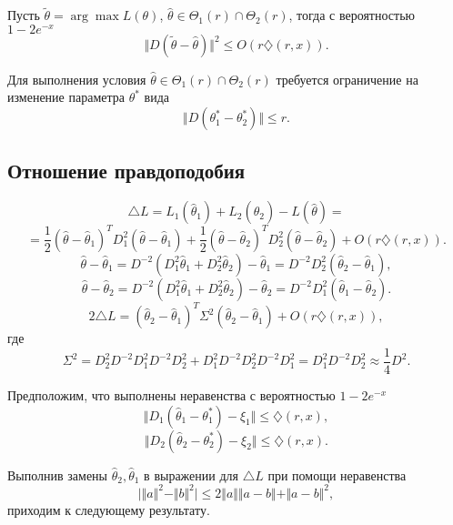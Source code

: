 \begin{lemma}
Пусть $\tilde{\theta} = \arg\max L(\theta)$, $\widehat{\theta} \in \Theta_1(r) \cap \Theta_2(r)$, тогда с вероятностью $1 - 2 e^{-x}$
\[
\Vert D (\tilde{\theta} -  \widehat{\theta}) \Vert^2 \leq O (r \diamondsuit (r, x)).
\]
\end{lemma}

\begin{remark}
Для выполнения условия $\widehat{\theta} \in \Theta_1(r) \cap \Theta_2(r)$ требуется ограничение на изменение параметра $\theta^*$ вида
\[\tag{L*}
\Vert D(\theta_1^* - \theta_2^*) \Vert \leq r.
\]  
\end{remark}

\subsection{Отношение правдоподобия} 

\[
\triangle L =
L_1(\widehat{\theta}_1) + L_2(\widehat{\theta}_2) -  L(\widehat{\theta}) = 
\]
\[
=   \frac{1}{2} (\widehat{\theta} - \widehat{\theta}_1)^T D_1^2  (\widehat{\theta} - \widehat{\theta}_1)
+ \frac{1}{2} (\widehat{\theta} - \widehat{\theta}_2)^T D_2^2  (\widehat{\theta} - \widehat{\theta}_2) + O(r \diamondsuit (r, x)).
\]
\[
\widehat{\theta} - \widehat{\theta}_1 = D^{-2} (D_1^2 \widehat{\theta}_1 + D_2^2 \widehat{\theta}_2 ) - \widehat{\theta}_1 = D^{-2} D_2^2 ( \widehat{\theta}_2 -  \widehat{\theta}_1),
\]
\[
\widehat{\theta} - \widehat{\theta}_2 = D^{-2} (D_1^2 \widehat{\theta}_1 + D_2^2 \widehat{\theta}_2 ) - \widehat{\theta}_2 = D^{-2} D_1^2 ( \widehat{\theta}_1 -  \widehat{\theta}_2).
\]
\[
2 \triangle L =  ( \widehat{\theta}_2 -  \widehat{\theta}_1)^T \Sigma^2 ( \widehat{\theta}_2 -  \widehat{\theta}_1) + O(r \diamondsuit (r, x)),
\]
где 
\[\tag{Sigma}
\Sigma^2 = D_2^2 D^{-2} D_1^2 D^{-2} D_2^2 + D_1^2 D^{-2} D_2^2 D^{-2} D_1^2
 = D_1^2 D^{-2}D_2^2 \approx \frac{1}{4} D^2. 
\]

Предположим, что выполнены неравенства с вероятностью $1 - 2 e^{-x}$
\[
\Vert D_1(\widehat{\theta}_1 - \theta_1^*) - \xi_1 \Vert \leq \diamondsuit (r, x),
\]
\[
\Vert D_2(\widehat{\theta}_2 - \theta_2^*) - \xi_2 \Vert \leq \diamondsuit (r, x).
\]

Выполнив замены $\widehat{\theta}_2,  \widehat{\theta}_1$ в выражении для $\triangle L$ при помощи неравенства
\[
\vert \Vert a \Vert^2  - \Vert b \Vert^2 \vert \leq 2 \Vert a \Vert \Vert a - b \Vert + \Vert a - b \Vert^2,
\] 
приходим к следующему результату.

